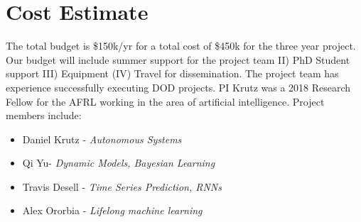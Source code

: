 \documentclass[12pt]{article}
\begin{document}

\vspace{-8mm}
\section{Cost Estimate} %
\vspace{-2mm}


The total budget is \$150k/yr for a total cost of \$450k for the three year project. Our budget will include summer support for the project team  II) PhD Student support III) Equipment (IV) Travel for dissemination. The project team has experience successfully executing DOD projects. %
PI Krutz was a 2018 Research Fellow for the AFRL working in the area of artificial intelligence. Project members include: %



			




\vspace{-3mm}
 \begin{multicols}{2}
     \begin{itemize}[noitemsep, leftmargin=*]
        \item Daniel Krutz - \emph{Autonomous Systems}
        \item Qi Yu- \emph{Dynamic Models, Bayesian Learning}
        \item Travis Desell - \emph{Time Series Prediction, RNNs}
        \item Alex Ororbia - \emph{Lifelong machine learning}
    \end{itemize}
\end{multicols}
\end{document}
